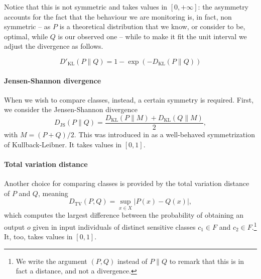 \documentclass[
]{ceurart}
\begin{document}
Notice that this is not symmetric and takes values in $[0,+\infty]$: the asymmetry accounts for the fact that the behaviour we are monitoring is, in fact, non symmetric -- as $P$ is a theoretical distribution that we know, or consider to be, optimal, while $Q$ is our observed one -- while to make it fit the unit interval we adjust the divergence as follows.

\[D'_{\mathrm{KL}}(P\parallel Q)=1-\exp (- D_{\mathrm{KL}}(P\parallel Q))\]

\paragraph{Jensen-Shannon divergence}
When we wish to compare classes, instead, a certain symmetry is required. First, we consider the Jensen-Shannon divergence 
\[D_{\mathrm{JS}}(P\parallel Q)=\frac{D_{\mathrm{KL}}(P\parallel M)+D_{\mathrm{KL}}(Q\parallel M)}{2},\]
with $M=(P+Q)/2$. This was introduced in \cite{lin_divergence} as a well-behaved symmetrization of Kullback-Leibner. It takes values in $[0,1]$.

\paragraph{Total variation distance}
Another choice for comparing classes is provided by the total variation distance of $P$ and $Q$, meaning
\[D_{\mathrm{TV}}(P, Q)= \sup _{x\in X} \vert P(x) - Q(x)\vert,\]
which computes the largest difference between the probability of obtaining an output $o$ given in input individuals of distinct sensitive classes $c_1\in F$ and $c_2\in F$.\footnote{We write the argument $(P,Q)$ instead of $P\parallel Q$ to remark that this is in fact a distance, and not a divergence.}  It, too, takes values in $[0,1]$. %

%

%
\end{document}
